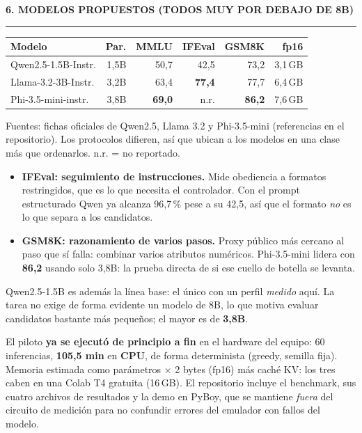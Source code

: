 \documentclass[9pt,a4paper]{extarticle}
\newcommand{\heading}[1]{%
  \par\vspace{1.1mm}\noindent
  {\color{navy}\bfseries\small\MakeUppercase{#1}}
  \par\vspace{0.7mm}\noindent
  {\color{amber}\rule{\linewidth}{1.1pt}}
  \par\vspace{0.6mm}\noindent\ignorespaces}
\begin{document}
\begin{multicols}{2}
\heading{6. Modelos propuestos (todos muy por debajo de 8B)}
{\centering
\begin{tabular}{@{}lrrrrr@{}}
\toprule
\textbf{Modelo} & \textbf{Par.} & \textbf{MMLU} & \textbf{IFEval} & \textbf{GSM8K} & \textbf{fp16}\\
\midrule
Qwen2.5-1.5B-Instr. & 1,5B & 50,7 & 42,5 & 73,2 & 3,1\,GB\\
Llama-3.2-3B-Instr. & 3,2B & 63,4 & \textbf{77,4} & 77,7 & 6,4\,GB\\
Phi-3.5-mini-instr. & 3,8B & \textbf{69,0} & n.r. & \textbf{86,2} & 7,6\,GB\\
\bottomrule
\end{tabular}\par}
\vspace{0.3mm}
{\footnotesize Fuentes: fichas oficiales de Qwen2.5, Llama 3.2 y Phi-3.5-mini (referencias en el repositorio). Los protocolos difieren, as\'i que ubican a los modelos en una clase m\'as que ordenarlos. n.r. = no reportado.}
\vspace{0.6mm}

\begin{itemize}
\item \textbf{IFEval: seguimiento de instrucciones.} Mide obediencia a formatos restringidos, que es lo que necesita el controlador. Con el prompt estructurado Qwen ya alcanza 96,7\,\% pese a su 42,5, as\'i que el formato \emph{no} es lo que separa a los candidatos.
\item \textbf{GSM8K: razonamiento de varios pasos.} Proxy p\'ublico m\'as cercano al paso que s\'i falla: combinar varios atributos num\'ericos. Phi-3.5-mini lidera con \textbf{86,2} usando solo 3,8B: la prueba directa de si ese cuello de botella se levanta.
\end{itemize}
Qwen2.5-1.5B es adem\'as la l\'inea base: el \'unico con un perfil \emph{medido} aqu\'i. La tarea no exige de forma evidente un modelo de 8B, lo que motiva evaluar candidatos bastante m\'as peque\~nos; el mayor es de \textbf{3,8B}.

\end{multicols}

\vspace{-2mm}
\begin{tcolorbox}[colback=paper,colframe=navy,boxrule=0.9pt,left=2.5mm,right=2.5mm,
                  top=1.2mm,bottom=1.2mm,arc=1mm,
                  fonttitle=\bfseries\footnotesize,coltitle=white,colbacktitle=navy,
                  title={7. VIABILIDAD DE EJECUCI\'ON Y REPRODUCIBILIDAD}]
\footnotesize
El piloto \textbf{ya se ejecut\'o de principio a fin} en el hardware del equipo: 60 inferencias, \textbf{105,5 min} en \textbf{CPU}, de forma determinista (greedy, semilla fija). Memoria estimada como par\'ametros $\times$ 2 bytes (fp16) m\'as cach\'e KV: los tres caben en una Colab T4 gratuita (16\,GB). El repositorio incluye el benchmark, sus cuatro archivos de resultados y la demo en PyBoy, que se mantiene \emph{fuera} del circuito de medici\'on para no confundir errores del emulador con fallos del modelo.
\end{tcolorbox}
\end{document}
